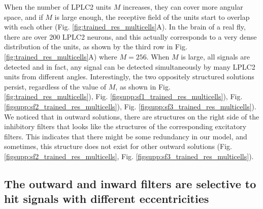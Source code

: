 \documentclass[9pt,lineno]{elife}
\begin{document}
When the number of LPLC2 units $M$ increases, they can cover more angular space, and if $M$ is large enough, the receptive field of the units start to overlap with each other (Fig. \ref{fig:trained_res_multicells}A). In the brain of a real fly, there are over 200 LPLC2 neurons, and this actually corresponds to a very dense distribution of the units, as shown by the third row in Fig. \ref{fig:trained_res_multicells}A) where $M=256$. When $M$ is large, all signals are detected and in fact, any signal can be detected simultaneously by many LPLC2 units from different angles. Interestingly, the two oppositely structured solutions persist, regardless of the value of $M$, as shown in Fig. \ref{fig:trained_res_multicells}), Fig. \ref{figsupp:sf1_trained_res_multicells}), Fig. \ref{figsupp:sf2_trained_res_multicells}), Fig. \ref{figsupp:sf3_trained_res_multicells}). We noticed that in outward solutions, there are structures on the right side of the inhibitory filters that looks like the structures of the corresponding excitatory filters. This indicates that there might be some redundancy in our model, and sometimes, this structure does not exist for other outward solutions (Fig. \ref{figsupp:sf2_trained_res_multicells}, Fig. \ref{figsupp:sf3_trained_res_multicells}). 


\subsection{The outward and inward filters are selective to hit signals with different eccentricities}




\end{document}
